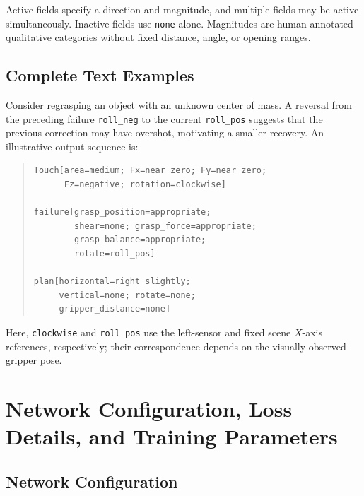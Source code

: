 Active fields specify a direction and magnitude, and multiple fields may be active simultaneously. Inactive fields use \texttt{none} alone. Magnitudes are human-annotated qualitative categories without fixed distance, angle, or opening ranges.

\subsection{Complete Text Examples}
\label{sec:app_text_examples}

Consider regrasping an object with an unknown center of mass. A reversal from the preceding failure \texttt{roll\_neg} to the current \texttt{roll\_pos} suggests that the previous correction may have overshot, motivating a smaller recovery. An illustrative output sequence is:
\begin{quote}
\footnotesize
\begin{verbatim}
Touch[area=medium; Fx=near_zero; Fy=near_zero;
      Fz=negative; rotation=clockwise]

failure[grasp_position=appropriate;
        shear=none; grasp_force=appropriate;
        grasp_balance=appropriate;
        rotate=roll_pos]

plan[horizontal=right slightly;
     vertical=none; rotate=none;
     gripper_distance=none]
\end{verbatim}
\end{quote}
Here, \texttt{clockwise} and \texttt{roll\_pos} use the left-sensor and fixed scene $X$-axis references, respectively; their correspondence depends on the visually observed gripper pose.


\section{Network Configuration, Loss Details, and Training Parameters}
\label{sec:app_network_training}

\subsection{Network Configuration}

